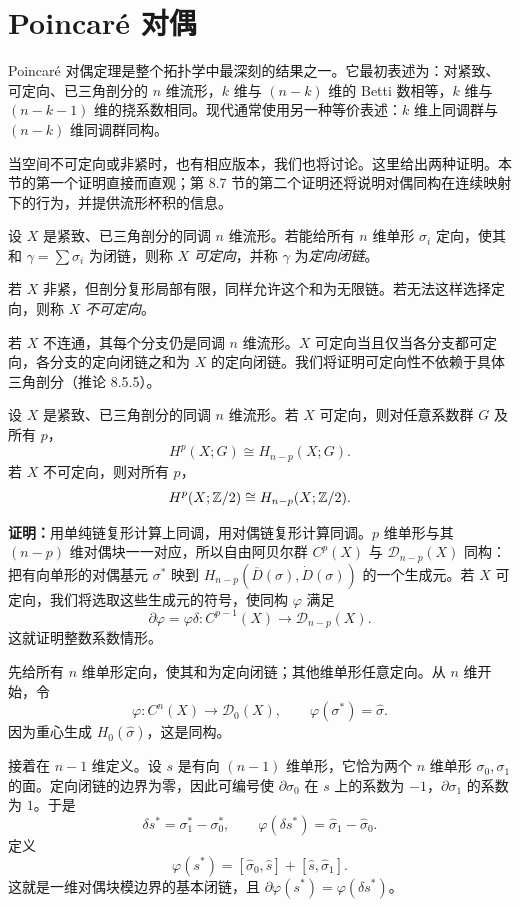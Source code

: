 \section{Poincaré 对偶}
Poincaré 对偶定理是整个拓扑学中最深刻的结果之一。它最初表述为：对紧致、可定向、已三角剖分的 $n$ 维流形，$k$ 维与 $(n-k)$ 维的 Betti 数相等，$k$ 维与 $(n-k-1)$ 维的挠系数相同。现代通常使用另一种等价表述：$k$ 维上同调群与 $(n-k)$ 维同调群同构。

当空间不可定向或非紧时，也有相应版本，我们也将讨论。这里给出两种证明。本节的第一个证明直接而直观；第 8.7 节的第二个证明还将说明对偶同构在连续映射下的行为，并提供流形杯积的信息。

设 $X$ 是紧致、已三角剖分的同调 $n$ 维流形。若能给所有 $n$ 维单形 $\sigma_i$ 定向，使其和 $\gamma=\sum\sigma_i$ 为闭链，则称 $X$ \emph{可定向}，并称 $\gamma$ 为\emph{定向闭链}。

若 $X$ 非紧，但剖分复形局部有限，同样允许这个和为无限链。若无法这样选择定向，则称 $X$ \emph{不可定向}。

若 $X$ 不连通，其每个分支仍是同调 $n$ 维流形。$X$ 可定向当且仅当各分支都可定向，各分支的定向闭链之和为 $X$ 的定向闭链。我们将证明可定向性不依赖于具体三角剖分（推论 8.5.5）。

设 $X$ 是紧致、已三角剖分的同调 $n$ 维流形。若 $X$ 可定向，则对任意系数群 $G$ 及所有 $p$，
\[H^p(X;G)\cong H_{n-p}(X;G).\]
若 $X$ 不可定向，则对所有 $p$，
\[H^p(X;\mathbb{Z}/2)\cong H_{n-p}(X;\mathbb{Z}/2).\]

\textbf{证明：}用单纯链复形计算上同调，用对偶链复形计算同调。$p$ 维单形与其 $(n-p)$ 维对偶块一一对应，所以自由阿贝尔群 $C^p(X)$ 与 $\mathcal D_{n-p}(X)$ 同构：把有向单形的对偶基元 $\sigma^*$ 映到 $H_{n-p}(\overline D(\sigma),\dot D(\sigma))$ 的一个生成元。若 $X$ 可定向，我们将选取这些生成元的符号，使同构 $\varphi$ 满足
\[\partial\varphi=\varphi\delta:C^{p-1}(X)\longrightarrow\mathcal D_{n-p}(X).\]
这就证明整数系数情形。

先给所有 $n$ 维单形定向，使其和为定向闭链；其他维单形任意定向。从 $n$ 维开始，令
\[\varphi:C^n(X)\to\mathcal D_0(X),\qquad\varphi(\sigma^*)=\widehat\sigma.\]
因为重心生成 $H_0(\widehat\sigma)$，这是同构。

接着在 $n-1$ 维定义。设 $s$ 是有向 $(n-1)$ 维单形，它恰为两个 $n$ 维单形 $\sigma_0,\sigma_1$ 的面。定向闭链的边界为零，因此可编号使 $\partial\sigma_0$ 在 $s$ 上的系数为 $-1$，$\partial\sigma_1$ 的系数为 $1$。于是
\[\delta s^*=\sigma_1^*-\sigma_0^*,\qquad
\varphi(\delta s^*)=\widehat\sigma_1-\widehat\sigma_0.\]
定义
\[\varphi(s^*)=[\widehat\sigma_0,\widehat s]+[\widehat s,\widehat\sigma_1].\]
这就是一维对偶块模边界的基本闭链，且 $\partial\varphi(s^*)=\varphi(\delta s^*)$。

